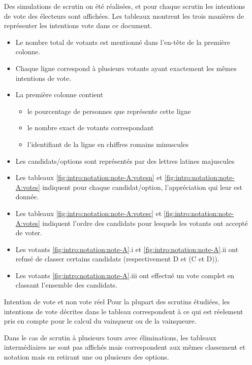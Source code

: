 \documentclass[../report]{subfiles}
\begin{document}
  Des simulations de scrutin on été réalisées, et pour chaque scrutin les intentions de vote des électeurs sont affichées.
  Les tableaux  montrent les trois manières de représenter les intentions vote dans ce document.
  \begin{itemize}
  	\item Le nombre total de votants est mentionné dans l'en-tête de la première colonne.
  	\item Chaque ligne correspond à plusieurs votants ayant exactement les mêmes intentions de vote.
  	\item La première colonne contient 
  	\begin{itemize}
  		\item le pourcentage de personnes que représente cette ligne
  		\item le nombre exact de votants correspondant 
  		\item l'identifiant de la ligne en chiffres romains minuscules
  	\end{itemize}
  	\item Les candidats/options sont représentés par des lettres latines majuscules
  	\item Les tableaux \ref{fig:intro:notation:note-A:votesn} et \ref{fig:intro:notation:note-A:votes} indiquent 
  	  pour chaque candidat/option, l'appréciation qui leur est donnée.
  	\item Les tableaux \ref{fig:intro:notation:note-A:votesc} et \ref{fig:intro:notation:note-A:votes} indiquent 
  	  l'ordre des candidats pour lesquels les votants ont accepté de voter.
  	\item Les votants \ref{fig:intro:notation:note-A}.i et \ref{fig:intro:notation:note-A}.ii ont refusé de classer certains candidats 
  	  (respectivement D et (C et D)).
  	\item Les votants \ref{fig:intro:notation:note-A}.iii ont effectué un vote complet en classant l'ensemble des candidats.
  \end{itemize}
  
  
  
  \begin{nota}{Intention de vote et non vote réel}
  	Pour la plupart des scrutins étudiées, les intentions de vote décrites dans le tableau correspondent à ce qui est réelement pris en
  	compte pour le calcul du vainqueur ou de la vainqueure.
  	
  	Dans le cas de scrutin à plusieurs tours avec éliminations, les tableaux intermédiaires ne sont pas affichés mais correspondent aux mêmes 
  	classement et notation mais en retirant une ou plusieurs des options.
  \end{nota}
  
\end{document}
